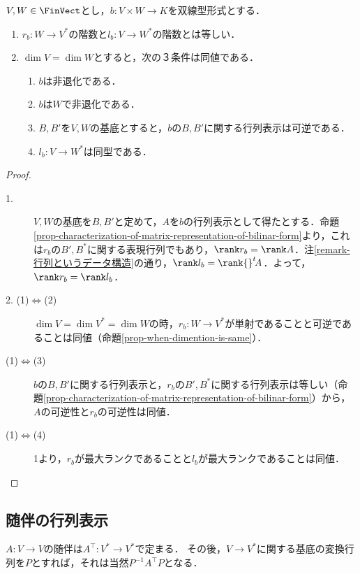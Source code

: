 \documentclass[uplatex, dvipdfmx]{jsreport}
\begin{document}
\begin{proposition}[定義の左右対称性と非退化性の特徴付け]
    $V,W\in\FinVect$とし，$b:V\times W\to K$を双線型形式とする．
    \begin{enumerate}
        \item $r_b:W\to V^*$の階数と$l_b:V\to W^*$の階数とは等しい．
        \item $\dim V=\dim W$とすると，次の３条件は同値である．
        \begin{enumerate}[(1)]
            \item $b$は非退化である．
            \item $b$は$W$で非退化である．
            \item $B,B'$を$V,W$の基底とすると，$b$の$B,B'$に関する行列表示は可逆である．
            \item $l_b:V\to W^*$は同型である．
        \end{enumerate}
    \end{enumerate}
\end{proposition}
\begin{proof}\mbox{}
    \begin{description}
        \item[1.] $V,W$の基底を$B,B'$と定めて，$A$を$b$の行列表示として得たとする．命題\ref{prop-characterization-of-matrix-representation-of-bilinar-form}より，これは$r_b$の$B',B^*$に関する表現行列でもあり，$\rank r_b=\rank A$．注\ref{remark-行列というデータ構造}の通り，$\rank l_b=\rank {}^t\!A$．よって，$\rank r_b=\rank l_b$．
        \item[2. (1)$\Leftrightarrow$(2)] $\dim V=\dim V^*=\dim W$の時，$r_b:W\to V^*$が単射であることと可逆であることは同値（命題\ref{prop-when-dimention-is-same}）．
        \item[(1)$\Leftrightarrow$(3)] $b$の$B,B'$に関する行列表示と，$r_b$の$B',B^*$に関する行列表示は等しい（命題\ref{prop-characterization-of-matrix-representation-of-bilinar-form}）から，$A$の可逆性と$r_b$の可逆性は同値．
        \item[(1)$\Leftrightarrow$(4)] 1より，$r_b$が最大ランクであることと$l_b$が最大ランクであることは同値．
    \end{description}
\end{proof}

\subsection{随伴の行列表示}

\begin{tcolorbox}[colframe=ForestGreen, colback=ForestGreen!10!white,breakable,colbacktitle=ForestGreen!40!white,coltitle=black,fonttitle=\bfseries\sffamily,
title=]
    $A:V\to V$の随伴は$A^\top:V^*\to V^*$で定まる．
    その後，$V\to V^*$に関する基底の変換行列を$P$とすれば，それは当然$P^{-1}A^\top P$となる．
\end{tcolorbox}
\end{document}
